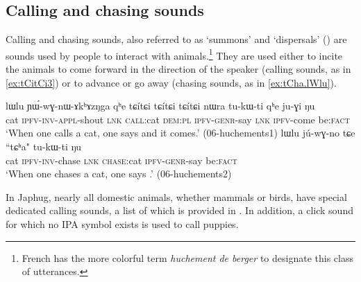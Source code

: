 \subsection{Calling  and chasing sounds} \label{sec:call}
Calling and chasing sounds, also referred to as `summons' and `dispersals' (\citealt[318--319]{aikhenvald10imperative}) are sounds used by people to interact with animals.\footnote{French has the more colorful term \textit{huchement de berger} to designate this class of utterances.} They are used either to incite the animals to come forward in the direction of the speaker (calling sounds, as in \ref{ex:tCitCi3}) or to advance or go away (chasing sounds, as in \ref{ex:tCha.lWlu}). 

\begin{exe}
\ex 
\begin{xlist}
\ex \label{ex:tCitCi3}
\gll lɯlu ɲɯ́-wɣ-nɯ-ɤkʰɤzŋga qʰe {tɕítɕi tɕítɕi tɕítɕi} nɯra tu-kɯ-ti qʰe ju-ɣi ŋu \\
cat \textsc{ipfv}-\textsc{inv}-\textsc{appl}-shout \textsc{lnk} \textsc{call}:cat \textsc{dem}:\textsc{pl} \textsc{ipfv}-\textsc{genr}-say \textsc{lnk} \textsc{ipfv}-come be:\textsc{fact} \\
\glt `When one calls a cat, one says  and it comes.' (06-huchements1)
\ex \label{ex:tCha.lWlu}
\gll lɯlu jú-wɣ-no tɕe ``tɕʰa" tu-kɯ-ti ŋu \\
cat \textsc{ipfv}-\textsc{inv}-chase \textsc{lnk} \textsc{chase}:cat \textsc{ipfv}-\textsc{genr}-say be:\textsc{fact} \\
\glt `When one chases a cat, one says .' (06-huchements2)
\end{xlist}
\end{exe}

In Japhug, nearly all domestic animals, whether mammals or birds, have special dedicated calling sounds, a list of which is provided in . In addition, a click sound for which no IPA symbol exists is used to call puppies.

